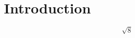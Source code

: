 \documentclass{article}
\title{Test #01}
\author{Thalles Eduardo}
\date{October 2024}
\begin{document}
\maketitle

\section{Introduction}

$$\sqrt{8}$$
\end{document}
